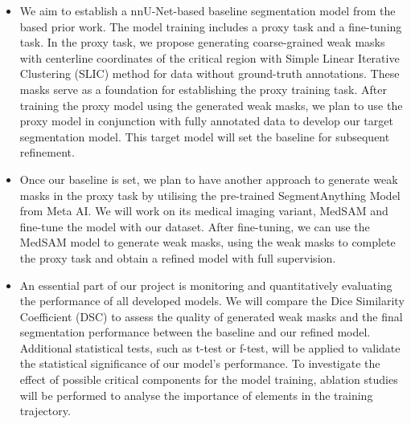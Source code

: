 \begin{itemize}

\item We aim to establish a nnU-Net-based baseline segmentation model from the based prior work. The model training includes a proxy task and a fine-tuning task. In the proxy task, we propose generating coarse-grained weak masks with centerline coordinates of the critical region with Simple Linear Iterative Clustering (SLIC) method for data without ground-truth annotations. These masks serve as a foundation for establishing the proxy training task. After training the proxy model using the generated weak masks, we plan to use the proxy model in conjunction with fully annotated data to develop our target segmentation model. This target model will set the baseline for subsequent refinement.
\item Once our baseline is set, we plan to have another approach to generate weak masks in the proxy task by utilising the pre-trained SegmentAnything Model \cite{kirillov2023segany} from Meta AI. We will work on its medical imaging variant, MedSAM and fine-tune the model with our dataset. After fine-tuning, we can use the MedSAM model to generate weak masks, using the weak masks to complete the proxy task and obtain a refined model with full supervision.

\item An essential part of our project is monitoring and quantitatively evaluating the performance of all developed models. We will compare the Dice Similarity Coefficient (DSC) to assess the quality of generated weak masks and the final segmentation performance between the baseline and our refined model. Additional statistical tests, such as t-test or f-test, will be applied to validate the statistical significance of our model's performance. To investigate the effect of possible critical components for the model training, ablation studies will be performed to analyse the importance of elements in the training trajectory. 
\end{itemize}